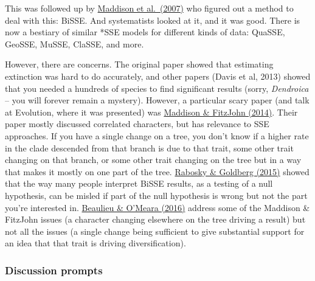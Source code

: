 \documentclass[]{article}
\begin{document}
This was followed up by \href{http://sysbio.oxfordjournals.org/content/56/5/701.short}{Maddison et al.~(2007)} who figured out a method to deal with this: BiSSE. And systematists looked at it, and it was good. There is now a bestiary of similar *SSE models for different kinds of data: QuaSSE, GeoSSE, MuSSE, ClaSSE, and more.

However, there are concerns. The original paper showed that estimating extinction was hard to do accurately, and other papers (Davis et al, 2013) showed that you needed a hundreds of species to find significant results (sorry, \emph{Dendroica} -- you will forever remain a mystery). However, a particular scary paper (and talk at Evolution, where it was presented) was \href{https://sysbio.oxfordjournals.org/content/early/2014/10/23/sysbio.syu070.full}{Maddison \& FitzJohn (2014)}. Their paper mostly discussed correlated characters, but has relevance to SSE approaches. If you have a single change on a tree, you don't know if a higher rate in the clade descended from that branch is due to that trait, some other trait changing on that branch, or some other trait changing on the tree but in a way that makes it mostly on one part of the tree. \href{http://sysbio.oxfordjournals.org/content/early/2015/01/18/sysbio.syu131}{Rabosky \& Goldberg (2015)} showed that the way many people interpret BiSSE results, as a testing of a null hypothesis, can be misled if part of the null hypothesis is wrong but not the part you're interested in. \href{http://sysbio.oxfordjournals.org/content/early/2016/03/25/sysbio.syw022.abstract}{Beaulieu \& O'Meara (2016)} address some of the Maddison \& FitzJohn issues (a character changing elsewhere on the tree driving a result) but not all the issues (a single change being sufficient to give substantial support for an idea that that trait is driving diversification).

\hypertarget{discussion-prompts}{%
\subsubsection{Discussion prompts}\label{discussion-prompts}}
\end{document}
